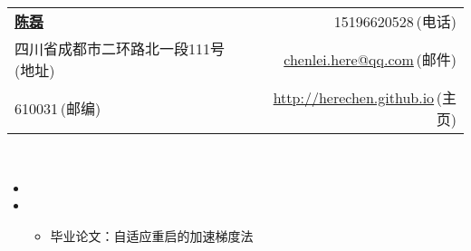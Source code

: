\documentclass[letterpaper,11pt]{article}
\begin{document}

\newcommand{\myheader}{
\begin{tabular*}{7.0in}{l@{\extracolsep{\fill}}r}
  \textbf{\href{http://herechen.github.io}{\LARGE 陈磊}} & 15196620528$\,${\color{labelgrey}(电话)} \\
  四川省成都市二环路北一段111号$\,${\color{labelgrey}(地址)} & \href{mailto:chenlei.here@qq.com}{chenlei.here@qq.com}$\,${\color{labelgrey}(邮件)} \\
  610031$\,${\color{labelgrey}(邮编)} & \href{http://herechen.github.io}{http://herechen.github.io}$\,${\color{labelgrey}(主页)} \\
  \end{tabular*}\\\vspace{0.1in}}

\myheader

  \begin{itemize}
    \item
    \item
      {\footnotesize
      \begin{itemize}
        \item 毕业论文：自适应重启的加速梯度法
      \end{itemize}
      }
  \end{itemize}
\end{document}
